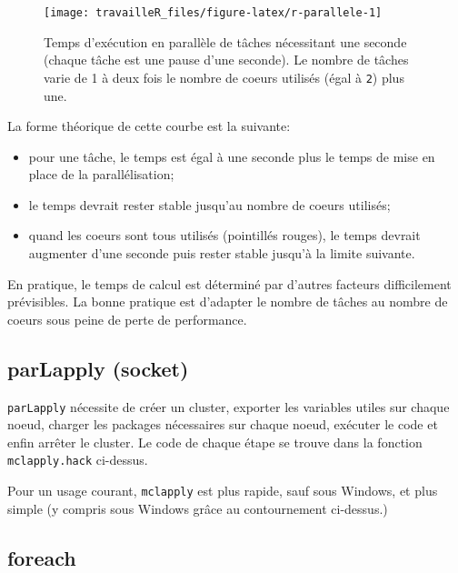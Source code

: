 \documentclass[
  12pt,
  french,
  a4paper,
  extrafontsizes,onecolumn,openright
  ]{memoir}
\providecommand{\tightlist}{%
  \setlength{\itemsep}{0pt}\setlength{\parskip}{0pt}}
\newlength{\rf}
\begin{document}
\begin{figure}

{\centering \texttt{[image: travailleR\_files/figure-latex/r-parallele-1]} 

}

\caption{Temps d'exécution en parallèle de tâches nécessitant une seconde (chaque tâche est une pause d'une seconde). Le nombre de tâches varie de 1 à deux fois le nombre de coeurs utilisés (égal à \texttt{2}) plus une.}\label{fig:r-parallele}
\end{figure}

\normalsize

La forme théorique de cette courbe est la suivante:

\begin{itemize}
\tightlist
\item
  pour une tâche, le temps est égal à une seconde plus le temps de mise en place de la parallélisation;
\item
  le temps devrait rester stable jusqu'au nombre de coeurs utilisés;
\item
  quand les coeurs sont tous utilisés (pointillés rouges), le temps devrait augmenter d'une seconde puis rester stable jusqu'à la limite suivante.
\end{itemize}

En pratique, le temps de calcul est déterminé par d'autres facteurs difficilement prévisibles.
La bonne pratique est d'adapter le nombre de tâches au nombre de coeurs sous peine de perte de performance.

\hypertarget{parlapply-socket}{%
\subsection{parLapply (socket)}\label{parlapply-socket}}

\texttt{parLapply} nécessite de créer un cluster, exporter les variables utiles sur chaque noeud, charger les packages nécessaires sur chaque noeud, exécuter le code et enfin arrêter le cluster.
Le code de chaque étape se trouve dans la fonction \texttt{mclapply.hack} ci-dessus.

Pour un usage courant, \texttt{mclapply} est plus rapide, sauf sous Windows, et plus simple (y compris sous Windows grâce au contournement ci-dessus.)

\hypertarget{foreach}{%
\subsection{foreach}\label{foreach}}
\end{document}

